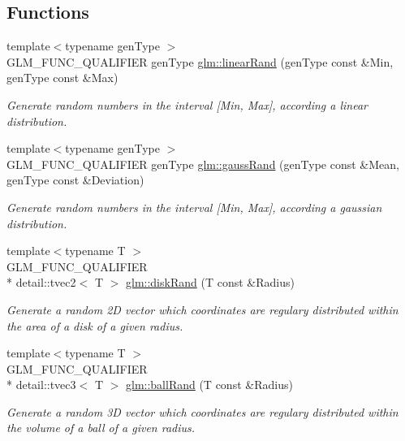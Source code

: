 \subsection*{Functions}
\begin{DoxyCompactItemize}
\item 
{\footnotesize template$<$typename gen\-Type $>$ }\\G\-L\-M\-\_\-\-F\-U\-N\-C\-\_\-\-Q\-U\-A\-L\-I\-F\-I\-E\-R gen\-Type \hyperlink{group__gtc__random_ga4fbce21c9727ffcd7f19813d6d7d8024}{glm\-::linear\-Rand} (gen\-Type const \&Min, gen\-Type const \&Max)
\begin{DoxyCompactList}\small\item\em Generate random numbers in the interval \mbox{[}Min, Max\mbox{]}, according a linear distribution. \end{DoxyCompactList}\item 
{\footnotesize template$<$typename gen\-Type $>$ }\\G\-L\-M\-\_\-\-F\-U\-N\-C\-\_\-\-Q\-U\-A\-L\-I\-F\-I\-E\-R gen\-Type \hyperlink{group__gtc__random_ga8cf40a2f2268b91103f763b6ea2c44d8}{glm\-::gauss\-Rand} (gen\-Type const \&Mean, gen\-Type const \&Deviation)
\begin{DoxyCompactList}\small\item\em Generate random numbers in the interval \mbox{[}Min, Max\mbox{]}, according a gaussian distribution. \end{DoxyCompactList}\item 
{\footnotesize template$<$typename T $>$ }\\G\-L\-M\-\_\-\-F\-U\-N\-C\-\_\-\-Q\-U\-A\-L\-I\-F\-I\-E\-R \\*
detail\-::tvec2$<$ T $>$ \hyperlink{group__gtc__random_gaacf5ed0c8f984b4ca3004019c573dc51}{glm\-::disk\-Rand} (T const \&Radius)
\begin{DoxyCompactList}\small\item\em Generate a random 2\-D vector which coordinates are regulary distributed within the area of a disk of a given radius. \end{DoxyCompactList}\item 
{\footnotesize template$<$typename T $>$ }\\G\-L\-M\-\_\-\-F\-U\-N\-C\-\_\-\-Q\-U\-A\-L\-I\-F\-I\-E\-R \\*
detail\-::tvec3$<$ T $>$ \hyperlink{group__gtc__random_gae568d57f4e563044292385f6a5659d82}{glm\-::ball\-Rand} (T const \&Radius)
\begin{DoxyCompactList}\small\item\em Generate a random 3\-D vector which coordinates are regulary distributed within the volume of a ball of a given radius. \end{DoxyCompactList}\item 

\end{DoxyCompactItemize}
